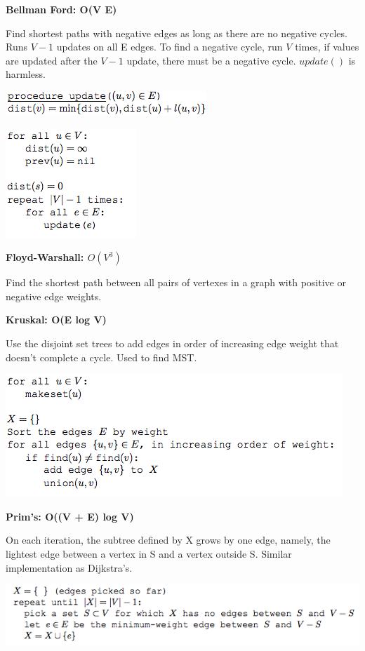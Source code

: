 \documentclass[landscape]{article}
\begin{document}
\begin{multicols}{3}
\textbf{Bellman Ford: O(V  E)}

Find shortest paths with negative edges as long as there are no negative cycles. Runs $V -1$ updates on all E edges. To find a negative cycle, run $V$ times, if values are updated after the $V -1$ update, there must be a negative cycle. $update()$ is harmless.

\includegraphics[scale=0.5]{BF1}

\includegraphics[scale=0.5]{BF2}

\textbf{Floyd-Warshall: $O(V^3)$}

Find the shortest path between all pairs of vertexes in a graph with positive or negative edge weights. 

\textbf{Kruskal: O(E log V)}

Use the disjoint set trees to add edges in order of increasing edge weight that doesn't complete a cycle. Used to find MST.

\includegraphics[scale=0.5]{kruskal}

\textbf{Prim's: O((V + E) log V)}

On each iteration, the subtree defined by X grows by one edge, namely, the lightest edge
between a vertex in S and a vertex outside S. Similar implementation as Dijkstra's. 

\includegraphics[scale=0.42]{prim}


\end{multicols}
\end{document}
